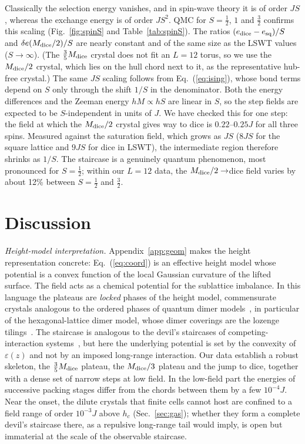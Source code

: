 \documentclass[prb,twocolumn,amsmath,amssymb,floatfix]{revtex4-2}
\newcommand{\Md}{M_{\rm dice}}
\newcommand{\eps}{\varepsilon}
\begin{document}
Classically the selection energy vanishes, and in spin-wave theory it is of order $JS$, whereas the exchange energy is of order $JS^2$. QMC for $S=\frac12$, $1$ and $\frac32$ confirms this scaling (Fig.~\ref{fig:spinS} and Table~\ref{tab:spinS}). The ratios $(e_{\rm dice}-e_{\rm sq})/S$ and $\delta e(\Md/2)/S$ are nearly constant and of the same size as the LSWT values ($S\to\infty$). (The $\frac35\Md$ crystal does not fit an $L=12$ torus, so we use the $\Md/2$ crystal, which lies on the hull chord next to it, as the representative hub-free crystal.) The same $JS$ scaling follows from Eq.~(\ref{eq:ising}), whose bond terms depend on $S$ only through the shift $1/S$ in the denominator. Both the energy differences and the Zeeman energy $hM\propto hS$ are linear in $S$, so the step fields are expected to be $S$-independent in units of $J$. We have checked this for one step: the field at which the $\Md/2$ crystal gives way to dice is $0.22$--$0.25J$ for all three spins. Measured against the saturation field, which grows as $JS$ ($8JS$ for the square lattice and $9JS$ for dice in LSWT), the intermediate region therefore shrinks as $1/S$. The staircase is a genuinely quantum phenomenon, most pronounced for $S=\frac12$; within our $L=12$ data, the $\Md/2\to$dice field varies by about 12\% between $S=\frac12$ and $\frac32$.

\section{Discussion}\label{sec:disc}

\emph{Height-model interpretation.} Appendix~\ref{app:geom} makes the height representation concrete: Eq.~(\ref{eq:coord}) is an effective height model whose potential is a convex function of the local Gaussian curvature of the lifted surface. The field acts as a chemical potential for the sublattice imbalance. In this language the plateaus are \emph{locked} phases of the height model, commensurate crystals analogous to the ordered phases of quantum dimer models~\cite{Rokhsar1988,Moessner2001}, in particular of the hexagonal-lattice dimer model, whose dimer coverings are the lozenge tilings~\cite{MoessnerSondhiChandra2001}. The staircase is analogous to the devil's staircases of competing-interaction systems~\cite{Bak1982}, but here the underlying potential is set by the convexity of $\eps(z)$ and not by an imposed long-range interaction. Our data establish a robust skeleton, the $\frac35\Md$ plateau, the $\Md/3$ plateau and the jump to dice, together with a dense set of narrow steps at low field. In the low-field part the energies of successive packing stages differ from the chords between them by a few $10^{-4}J$. Near the onset, the dilute crystals that finite cells cannot host are confined to a field range of order $10^{-3}J$ above $h_c$ (Sec.~\ref{sec:gas}); whether they form a complete devil's staircase there, as a repulsive long-range tail would imply, is open but immaterial at the scale of the observable staircase.
\end{document}
